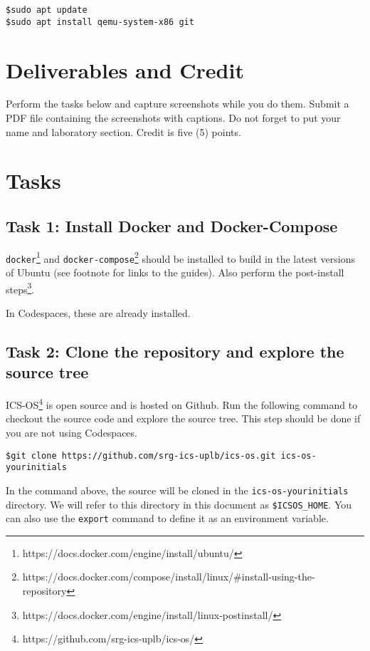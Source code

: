 \documentclass[a4paper, 11pt,oneside]{article}
\begin{document}
\begin{verbatim}
$sudo apt update
$sudo apt install qemu-system-x86 git
\end{verbatim}


\section{Deliverables and Credit}
Perform the tasks below and capture screenshots while you do them. Submit a PDF 
file containing the screenshots with captions. Do not forget to put your name 
and laboratory section. Credit is five (5) points.

\section{Tasks}

\subsection*{Task 1: Install Docker and Docker-Compose}
\texttt{docker}\footnote{https://docs.docker.com/engine/install/ubuntu/} and 
\texttt{docker-compose}\footnote{https://docs.docker.com/compose/install/linux/\#install-using-the-repository} 
should be installed to build in the latest versions of Ubuntu (see footnote for 
links to the guides). Also perform the post-install steps\footnote{https://docs.docker.com/engine/install/linux-postinstall/}. 

In Codespaces, these are already installed.

\subsection*{Task 2: Clone the repository and explore the source tree}
ICS-OS\footnote{https://github.com/srg-ics-uplb/ics-os/} is open source and is 
hosted on Github. Run the following command to checkout the source code and 
explore the source tree. This step should be done if you are not using Codespaces.


\begin{verbatim}
$git clone https://github.com/srg-ics-uplb/ics-os.git ics-os-yourinitials
\end{verbatim}

In the command above, the source will be cloned in the \texttt{ics-os-yourinitials} directory. We will refer to this directory in this document as \texttt{\$ICSOS\_HOME}. You can also use the \texttt{export} command to define it as an environment variable.
\end{document}
